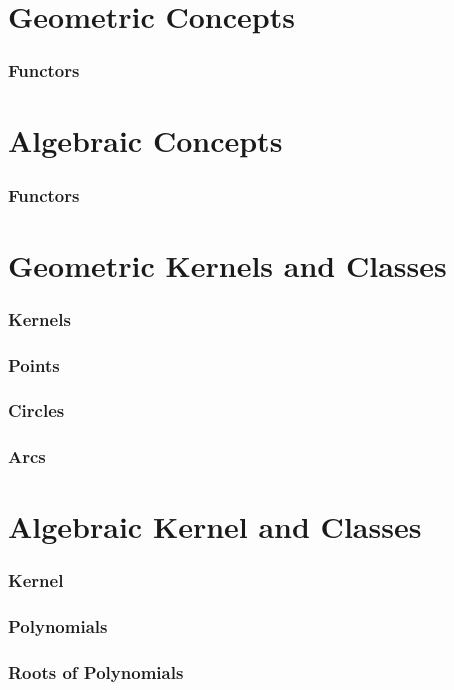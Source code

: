 

\section{Geometric Concepts}



	\subsubsection*{Functors}

\section{Algebraic Concepts}


	\subsubsection*{Functors}

\section{Geometric Kernels and Classes}

	\subsubsection*{Kernels}

	\subsubsection*{Points}

	\subsubsection*{Circles}

	\subsubsection*{Arcs}

\section{Algebraic Kernel and Classes}

	\subsubsection*{Kernel}

	\subsubsection*{Polynomials} 

	\subsubsection*{Roots of Polynomials}
